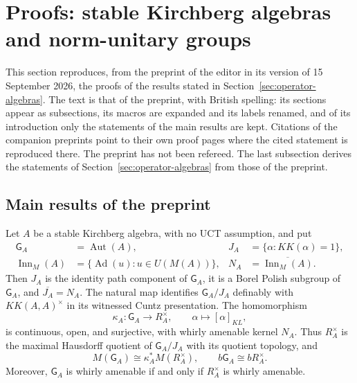 \section{Proofs: stable Kirchberg algebras and norm-unitary groups}\label{sec:proofs-stable-kirchberg}

This section reproduces, from the preprint of the editor \cite{LupiniStable2026} in its version of 15 September 2026, the
proofs of the results stated in Section~\ref{sec:operator-algebras}. The text is that of the
preprint, with British spelling: its sections appear as subsections, its macros
are expanded and its labels renamed, and of its introduction only the
statements of the main results are kept. Citations of the companion preprints
point to their own proof pages where the cited statement is reproduced there.
The preprint has not been refereed. The last subsection derives the statements
of Section~\ref{sec:operator-algebras} from those of the preprint.

\subsection{Main results of the preprint}\label{sec:st-main-results}

\begin{theorem}\label{thm:st-kk}
 Let $A$ be a stable Kirchberg algebra, with no UCT
assumption, and put 
\begin{equation*}
\begin{aligned}
 \mathsf G_A&=\operatorname{Aut}(A), & J_A&=\{\alpha:KK(\alpha)=1\},\\
 \operatorname{Inn}_M(A)&=\{\operatorname{Ad}(u):u\in U(M(A))\}, &
 N_A&=\overline{\operatorname{Inn}_M(A)}.
 \end{aligned}
\end{equation*}
Then $J_A$ is the identity path component of $\mathsf G_A$, it is a Borel Polish
subgroup of $\mathsf G_A$, and $\overline{J_A}=N_A$. The natural map identifies $\mathsf G_A/J_A$ definably with $KK(A,A)^\times$ in its witnessed Cuntz
presentation. The homomorphism 
\begin{equation*}
\kappa_A:\mathsf G_A\longrightarrow R_A^\times,\qquad  \alpha\longmapsto[\alpha]_{KL}, 
\end{equation*}
is continuous, open, and surjective, with whirly amenable kernel $N_A$.
Thus $R_A^\times$ is the maximal Hausdorff quotient of $\mathsf G_A/J_A$ with its
quotient topology, and 
\begin{equation}  \label{eq:st-main-kl}
M(\mathsf G_A)\cong\kappa_A^*M(R_A^\times),\qquad b\mathsf G_A\cong bR_A^\times.
\end{equation}
Moreover, $\mathsf G_A$ is whirly amenable if and only if $R_A^\times$ is whirly
amenable.
\end{theorem}

